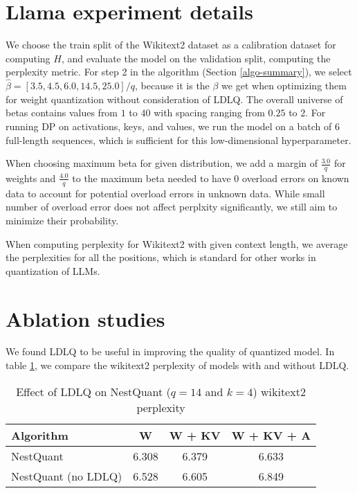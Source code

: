 \section{Llama experiment details}

\label{sec:hyperparams}

We choose the train split of the Wikitext2 \cite{merity2016pointer} dataset as a calibration dataset for computing $H$, and evaluate the model on the validation split, computing the perplexity metric. For step 2 in the algorithm (Section \ref{algo-summary}), we select $\hat{\beta} = [3.5, 4.5, 6.0, 14.5, 25.0]/q$, because it is the $\beta$ we get when optimizing them for weight quantization without consideration of LDLQ. The overall universe of betas contains values from $1$ to $40$ with spacing ranging from $0.25$ to $2$. For running DP on activations, keys, and values, we run the model on a batch of $6$ full-length sequences, which is sufficient for this low-dimensional hyperparameter.

When choosing maximum beta for given distribution, we add a margin of $\frac{3.0}{q}$ for weights and $\frac{4.0}{q}$ to the maximum beta needed to have $0$ overload errors on known data to account for potential overload errors in unknown data. While small number of overload error does not affect perplxity significantly, we still aim to minimize their probability.

When computing perplexity for Wikitext2 with given context length, we average the perplexities for all the positions, which is standard for other works in quantization of LLMs.

\section{Ablation studies}

\label{sec:ablation}

We found LDLQ to be useful in improving the quality of quantized model. In table \ref{tab:ldlq_ppl}, we compare the wikitext2 perplexity of models with and without LDLQ.

\begin{table}[h]
\centering
\scriptsize
\begin{tabular}{lccc}
    \toprule
Algorithm &  \textbf{W}&
\textbf{W + KV}&
\textbf{W + KV + A}\\    \midrule
    NestQuant & 6.308& 6.379& 6.633\\
    NestQuant (no LDLQ) & 6.528& 6.605& 6.849 \\
    \bottomrule
\end{tabular}
\ifisicml\else\vspace{1em}\fi
\caption{Effect of LDLQ on NestQuant ($q=14$ and $k=4$) wikitext2 perplexity} 
\label{tab:ldlq_ppl}
\end{table}

